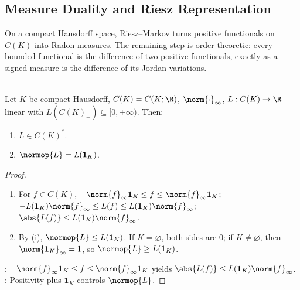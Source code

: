 \subsection{Measure Duality and Riesz Representation}

On a compact Hausdorff space, Riesz--Markov turns positive functionals on $C(K)$ into Radon measures. The remaining step is order-theoretic: every bounded functional is the difference of two positive functionals, exactly as a signed measure is the difference of its Jordan variations.

\begin{proposition} \label{prop:positive-functionals-on-cx-are-continuous} \\
Let $K$ be compact Hausdorff, $C(K)=C(K;\R)$, $\norm{\cdot}_\infty$, $L:C(K)\to\R$ linear with $L(C(K)_+)\subseteq[0,+\infty)$. Then:
\begin{enumerate}[label=(\roman*)]
\setlength{\itemsep}{0pt}
\item $L\in C(K)^*$.
\item $\normop{L}=L(\mathbf{1}_K)$.
\end{enumerate}
\begin{proof}
\begin{enumerate}[label=(\roman*)]
\setlength{\itemsep}{0pt}
\item For $f\in C(K)$, $-\norm{f}_\infty\mathbf{1}_K\leq f\leq\norm{f}_\infty\mathbf{1}_K$;$-L(\mathbf{1}_K)\norm{f}_\infty\leq L(f)\leq L(\mathbf{1}_K)\norm{f}_\infty$; $\abs{L(f)}\leq L(\mathbf{1}_K)\norm{f}_\infty$.
\item By (i), $\normop{L}\leq L(\mathbf{1}_K)$. If $K=\varnothing$, both sides are $0$; if $K\neq\varnothing$, then $\norm{\mathbf{1}_K}_\infty=1$, so $\normop{L}\geq L(\mathbf{1}_K)$.
\end{enumerate}
: $-\norm{f}_\infty\mathbf{1}_K\leq f\leq\norm{f}_\infty\mathbf{1}_K$ yields $\abs{L(f)}\leq L(\mathbf{1}_K)\norm{f}_\infty$.\\
: Positivity plus $\mathbf{1}_K$ controls $\normop{L}$.
\end{proof}
\end{proposition}

